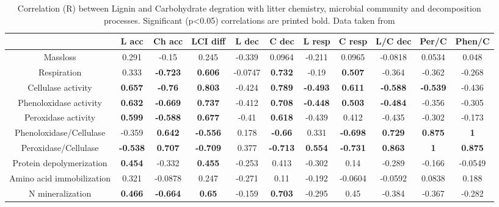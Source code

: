 \documentclass[authoryear,preprint,review,12pt]{elsarticle}
\begin{document}
\begin{table}[h!]
\begin{center}
\caption{Correlation (R) between Lignin and Carbohydrate degration with litter chemistry, microbial community and decomposition processes. Significant (p<0.05) correlations are printed bold. Data taken from \cite{Mooshammer2011, Leitner2011, Frank2011}}
\label{corrtable}
{\tiny
\begin{tabular}{ccccccccccc}
  \hline
 & L acc & Ch acc & LCI diff & L dec & C dec & L resp & C resp & L/C dec & Per/C & Phen/C \\ 
  \hline
Massloss & 0.291 & -0.15 & 0.245 & -0.339 & 0.0964 & -0.211 & 0.0965 & -0.0818 & 0.0534 & 0.048 \\ 
  Respiration & 0.333 & \textbf{ -0.723 } & \textbf{ 0.606 } & -0.0747 & \textbf{ 0.732 } & -0.19 & \textbf{ 0.507 } & -0.364 & -0.362 & -0.268 \\ 
  Cellulase activity & \textbf{ 0.657 } & \textbf{ -0.76 } & \textbf{ 0.803 } & -0.424 & \textbf{ 0.789 } & \textbf{ -0.493 } & \textbf{ 0.611 } & \textbf{ -0.588 } & \textbf{ -0.539 } & -0.436 \\ 
  Phenoloxidase activity & \textbf{ 0.632 } & \textbf{ -0.669 } & \textbf{ 0.737 } & -0.412 & \textbf{ 0.708 } & \textbf{ -0.448 } & \textbf{ 0.503 } & \textbf{ -0.484 } & -0.356 & -0.305 \\ 
  Peroxidase activity & \textbf{ 0.599 } & \textbf{ -0.588 } & \textbf{ 0.677 } & -0.41 & \textbf{ 0.618 } & -0.439 & 0.412 & -0.435 & -0.302 & -0.173 \\ 
  Phenoloxidase/Cellulase & -0.359 & \textbf{ 0.642 } & \textbf{ -0.556 } & 0.178 & \textbf{ -0.66 } & 0.331 & \textbf{ -0.698 } & \textbf{ 0.729 } & \textbf{ 0.875 } & \textbf{    1 } \\ 
  Peroxidase/Cellulase & \textbf{ -0.538 } & \textbf{ 0.707 } & \textbf{ -0.709 } & 0.377 & \textbf{ -0.713 } & \textbf{ 0.554 } & \textbf{ -0.731 } & \textbf{ 0.863 } & \textbf{    1 } & \textbf{ 0.875 } \\ 
  Protein depolymerization & \textbf{ 0.454 } & -0.332 & \textbf{ 0.455 } & -0.253 & 0.413 & -0.302 & 0.14 & -0.289 & -0.166 & -0.0549 \\ 
  Amino acid immobilization & 0.321 & -0.0878 & 0.247 & -0.271 & 0.11 & -0.192 & -0.0604 & -0.0592 & 0.0838 & 0.188 \\ 
  N mineralization & \textbf{ 0.466 } & \textbf{ -0.664 } & \textbf{ 0.65 } & -0.159 & \textbf{ 0.703 } & -0.295 & 0.45 & -0.384 & -0.367 & -0.282 \\ 

\end{tabular}}
\end{center}
\end{table}
\end{document}
